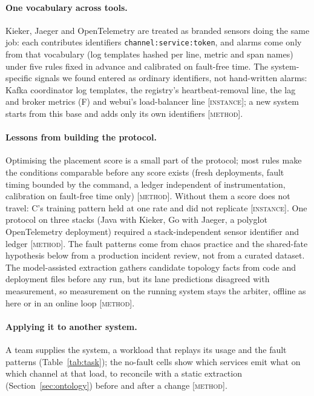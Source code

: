 \documentclass{ceurart}
\newcommand{\scope}[1]{\textsc{[#1]}}
\begin{document}
\paragraph{One vocabulary across tools.} Kieker, Jaeger and OpenTelemetry are treated as branded sensors doing the same job:
each contributes identifiers \texttt{channel:service:token}, and alarms come only from that vocabulary (log templates hashed
per line, metric and span names) under five rules fixed in advance and calibrated on fault-free time. The system-specific
signals we found entered as ordinary identifiers, not hand-written alarms: Kafka coordinator log templates, the registry's
heartbeat-removal line, the lag and broker metrics (F) and webui's load-balancer line \scope{instance}; a new system starts from this base and adds only its own
identifiers \scope{method}.

\paragraph{Lessons from building the protocol.} Optimising the placement score is a small part of the protocol; most rules
make the conditions comparable before any score exists (fresh deployments, fault timing bounded by the command, a ledger
independent of instrumentation, calibration on fault-free time only) \scope{method}. Without them a score does not travel:
C's training pattern held at one rate and did not replicate \scope{instance}. One protocol on three stacks (Java with
Kieker, Go with Jaeger, a polyglot OpenTelemetry deployment) required a stack-independent sensor identifier and ledger
\scope{method}. The fault patterns come from chaos practice and the shared-fate hypothesis below from a production
incident review, not from a curated dataset. The model-assisted extraction gathers candidate topology facts from code and
deployment files before any run, but its lane predictions disagreed with measurement, so measurement on the running system
stays the arbiter, offline as here or in an online loop \scope{method}.

\paragraph{Applying it to another system.} A team supplies the system, a workload that replays its usage and the fault
patterns (Table~\ref{tab:task}); the no-fault cells show which services emit what on which channel at that load, to
reconcile with a static extraction (Section~\ref{sec:ontology}) before and after a change \scope{method}.
\end{document}
